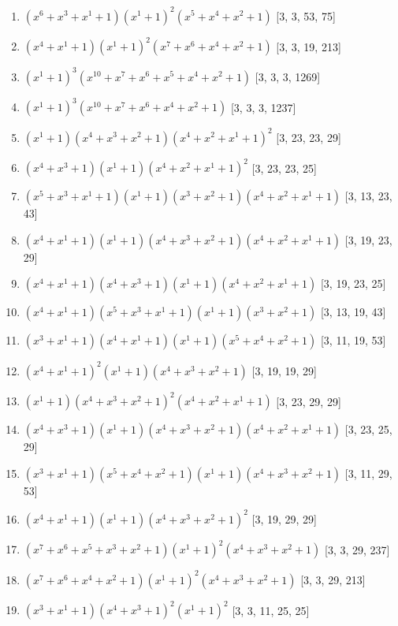 \documentclass[10pt,twocolumn]{article}
\begin{document}
\begin{enumerate}
\item $(x^{6} + x^{3} + x^{1} + 1)(x^{1} + 1)^{2}(x^{5} + x^{4} + x^{2} + 1)$  [3, 3, 53, 75]
\item $(x^{4} + x^{1} + 1)(x^{1} + 1)^{2}(x^{7} + x^{6} + x^{4} + x^{2} + 1)$  [3, 3, 19, 213]
\item $(x^{1} + 1)^{3}(x^{10} + x^{7} + x^{6} + x^{5} + x^{4} + x^{2} + 1)$  [3, 3, 3, 1269]
\item $(x^{1} + 1)^{3}(x^{10} + x^{7} + x^{6} + x^{4} + x^{2} + 1)$  [3, 3, 3, 1237]
\item $(x^{1} + 1)(x^{4} + x^{3} + x^{2} + 1)(x^{4} + x^{2} + x^{1} + 1)^{2}$  [3, 23, 23, 29]
\item $(x^{4} + x^{3} + 1)(x^{1} + 1)(x^{4} + x^{2} + x^{1} + 1)^{2}$  [3, 23, 23, 25]
\item $(x^{5} + x^{3} + x^{1} + 1)(x^{1} + 1)(x^{3} + x^{2} + 1)(x^{4} + x^{2} + x^{1} + 1)$  [3, 13, 23, 43]
\item $(x^{4} + x^{1} + 1)(x^{1} + 1)(x^{4} + x^{3} + x^{2} + 1)(x^{4} + x^{2} + x^{1} + 1)$  [3, 19, 23, 29]
\item $(x^{4} + x^{1} + 1)(x^{4} + x^{3} + 1)(x^{1} + 1)(x^{4} + x^{2} + x^{1} + 1)$  [3, 19, 23, 25]
\item $(x^{4} + x^{1} + 1)(x^{5} + x^{3} + x^{1} + 1)(x^{1} + 1)(x^{3} + x^{2} + 1)$  [3, 13, 19, 43]
\item $(x^{3} + x^{1} + 1)(x^{4} + x^{1} + 1)(x^{1} + 1)(x^{5} + x^{4} + x^{2} + 1)$  [3, 11, 19, 53]
\item $(x^{4} + x^{1} + 1)^{2}(x^{1} + 1)(x^{4} + x^{3} + x^{2} + 1)$  [3, 19, 19, 29]
\item $(x^{1} + 1)(x^{4} + x^{3} + x^{2} + 1)^{2}(x^{4} + x^{2} + x^{1} + 1)$  [3, 23, 29, 29]
\item $(x^{4} + x^{3} + 1)(x^{1} + 1)(x^{4} + x^{3} + x^{2} + 1)(x^{4} + x^{2} + x^{1} + 1)$  [3, 23, 25, 29]
\item $(x^{3} + x^{1} + 1)(x^{5} + x^{4} + x^{2} + 1)(x^{1} + 1)(x^{4} + x^{3} + x^{2} + 1)$  [3, 11, 29, 53]
\item $(x^{4} + x^{1} + 1)(x^{1} + 1)(x^{4} + x^{3} + x^{2} + 1)^{2}$  [3, 19, 29, 29]
\item $(x^{7} + x^{6} + x^{5} + x^{3} + x^{2} + 1)(x^{1} + 1)^{2}(x^{4} + x^{3} + x^{2} + 1)$  [3, 3, 29, 237]
\item $(x^{7} + x^{6} + x^{4} + x^{2} + 1)(x^{1} + 1)^{2}(x^{4} + x^{3} + x^{2} + 1)$  [3, 3, 29, 213]
\item $(x^{3} + x^{1} + 1)(x^{4} + x^{3} + 1)^{2}(x^{1} + 1)^{2}$  [3, 3, 11, 25, 25]

\end{enumerate}
\end{document}
